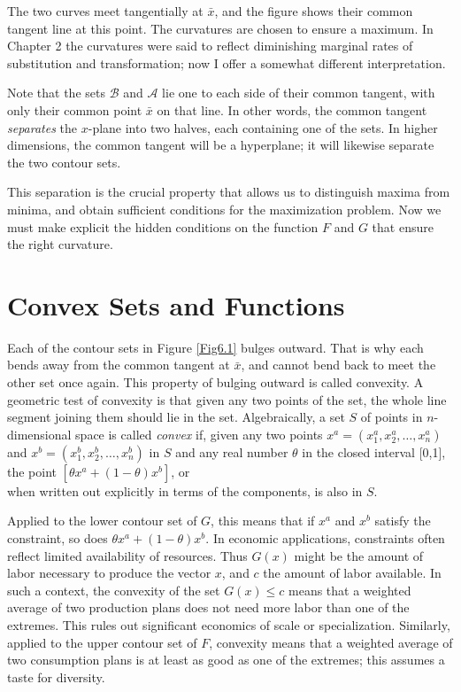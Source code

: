 The two curves meet tangentially at $\bar{x}$, and the figure shows their common tangent line at this point. The curvatures are chosen to ensure a maximum. In Chapter 2 the curvatures were said to reflect diminishing marginal rates of substitution and transformation; now I offer a somewhat different interpretation.

Note that the sets $\mathcal{B}$ and $\mathcal{A}$ lie one to each side of their  common tangent, with only their common point $\bar{x}$ on that line. In other words, the common tangent \textit{separates} the $x$-plane into two halves, each containing one of the sets. In higher dimensions, the common tangent will be a hyperplane; it will likewise separate the two contour sets.

This separation is the crucial property that allows us to distinguish maxima from minima, and obtain sufficient conditions for the maximization problem. Now we must make explicit the hidden conditions on the function $F$ and $G$ that ensure the right curvature.

\section*{Convex Sets and Functions}

Each of the contour sets in Figure \ref{Fig6.1} bulges outward. That is why each bends away from the common tangent at $\bar{x}$, and cannot bend back to meet the other set once again. This property of bulging outward is called convexity. A geometric test of convexity is that given any two points of the set, the whole line segment joining them should lie in the set. Algebraically, a set $S$ of points in $n$-dimensional space is called \textit{convex} if, given any two points $x^a=( x_1^a, x_2^a, \dots, x_n^a)$ and $x^b=( x_1^b, x_2^b, \dots, x_n^b)$ in $S$ and any real number $\theta$ in the closed interval [0,1], the point $[  \theta x^a + (1-\theta)x^b ]$, or
\begin{equation*}
[\theta x_1^a +(1-\theta)x_1^b, \theta x_2^a +(1-\theta)x_2^b, \dots, \theta x_n^a +(1-\theta)x_n^b, ]
\end{equation*}
when written out explicitly in terms of the components, is also in $S$.

Applied to the lower contour set of $G$, this means that if $x^a$ and $x^b$ satisfy the constraint, so does $\theta x^a + (1-\theta)x^b$. In economic applications, constraints often reflect limited availability of resources. Thus $G(x)$ might be the amount of labor necessary to produce the vector $x$, and $c$ the amount of labor available. In such a context, the convexity of the set $G(x) \leq c$ means that a weighted average of two production plans does not need more labor than one of the extremes. This rules out significant economics of scale or specialization. Similarly, applied to the upper contour set of $F$, convexity means that a weighted average of two consumption plans is at least as good as one of the extremes; this assumes a taste for diversity.

